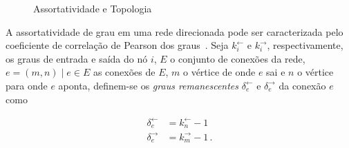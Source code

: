 \documentclass[
  article,
  11pt,
  a4paper,
  english,
  brazil,
  sumario=tradicional]{abntex2}
\begin{document}
\begin{figure}[ht]
    \centering
    \caption{Assortatividade e Topologia}
\end{figure}


A assortatividade de grau em uma rede direcionada pode ser caracterizada pelo coeficiente de correlação de Pearson dos graus~\cite{Barabasi2016-rn}. Seja $k_i^\leftarrow$ e $k_i^\rightarrow$,  respectivamente, os graus de entrada e saída do nó $i$, $E$ o conjunto de conexões da rede, $e = (m, n) \mid e \in E$ as conexões de $E$, $m$ o vértice de onde $e$ sai e $n$ o vértice para onde $e$ aponta, definem-se os \textit{graus remanescentes} $\delta_e^\leftarrow$ e $\delta_e^\rightarrow$ da conexão $e$ como

\begin{align*}
\delta_e^\leftarrow &= k_n^\leftarrow - 1
\\
\delta_e^\rightarrow &= k_m^\rightarrow - 1\,.
\end{align*}
\end{document}
